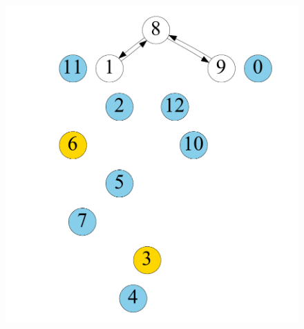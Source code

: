 \begin{figure}[t]
\begin{minipage}[b]{0.19\linewidth}
        \end{minipage}
    \begin{minipage}[b]{0.19\linewidth}
            \centering
                        {\includegraphics[width=\textwidth]{./alg_fig/scc-g5}}
   		\end{minipage}                  
    \begin{minipage}[b]{0.19\linewidth}
            \centering

\end{minipage}
\end{figure}
